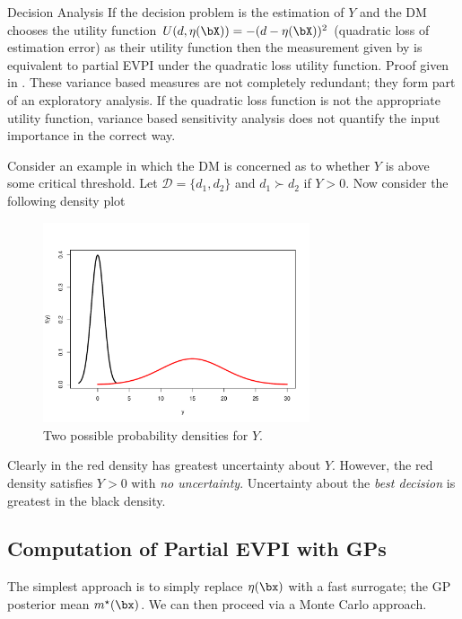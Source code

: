 \begin{chapter}{Decision Analysis \label{Ch:decision}}
If the decision problem is the estimation of $Y$ and the DM chooses the utility function $U(d, \eta(\bX)) = -(d - \eta(\bX))^2$ (quadratic loss of estimation error) as their utility function then the measurement given by  is equivalent to partial EVPI under the quadratic loss utility function. Proof given in .
These variance based measures are not completely redundant; they form part of an exploratory analysis. If the quadratic loss function is not the appropriate utility function, variance based sensitivity analysis does not quantify the input importance in the correct way.

Consider an example in which the DM is concerned as to whether $Y$ is above some critical threshold. Let $\mathcal{D} = \{ d_1, d_2 \}$ and $d_1 \succ d_2$ if $Y>0$. Now consider the following density plot

\begin{figure}
	\centering
	\includegraphics[width = 0.7\textwidth]{dec-fig/y-density.pdf}
	\caption{Two possible probability densities for $Y$.}
	\label{Fig:y-density}
\end{figure}

Clearly in  the red density has greatest uncertainty about $Y$. However, the red density satisfies $Y>0$ with \textit{no uncertainty}. Uncertainty about the \textit{best decision} is greatest in the black density.

\subsection{Computation of Partial EVPI with GPs}

The simplest approach is to simply replace $\eta(\bx)$ with a fast surrogate; the GP posterior mean $m^{\star}(\bx)$. We can then proceed via a Monte Carlo approach.


\end{chapter}
